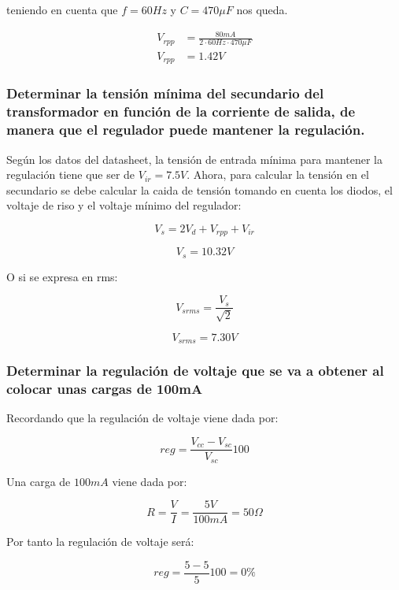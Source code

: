 teniendo en cuenta que $f= 60Hz$ y $C= 470\mu F$  nos queda.

\begin{align*}
    V_{rpp} &= \frac{80m A}{2 \cdot 60Hz \cdot 470\mu F} \\
    V_{rpp} &= 1.42 V
\end{align*}

\subsubsection*{Determinar la tensión mínima del secundario del transformador en función de la corriente de salida, de manera que el regulador puede mantener la regulación.}

Según los datos del datasheet, la tensión de entrada mínima para mantener la regulación tiene que  ser de $ V_{ir} = 7.5V$. Ahora, para calcular la tensión en el secundario se debe calcular la caida de tensión tomando en cuenta los diodos, el voltaje de riso y el voltaje mínimo del regulador:

\begin{equation}
    V_{s} = 2 V_{d} + V_{rpp} + V_{ir}
    \label{eq:tension-min-secundario}
\end{equation}

$$ V_{s} = 10.32 V $$
 
O si se expresa en rms:

$$ V_{srms} = \frac{V_s}{\sqrt{2}} $$

$$ V_{srms} = 7.30 V $$

\subsubsection*{Determinar la regulación de voltaje que se va a obtener al colocar unas cargas de 100mA}

Recordando que la regulación de voltaje viene dada por:

\begin{equation}
    reg = \frac{V_{cc} - V_{sc}}{V_{sc}} 100 %
\end{equation}

Una carga de $100mA$ viene dada por:

$$ R = \frac{V}{I} = \frac{5V}{100mA} = 50 \Omega $$

Por tanto la regulación de voltaje será:

\begin{equation}
    reg = \frac{5 -5}{5} 100 = 0\%
\end{equation}

